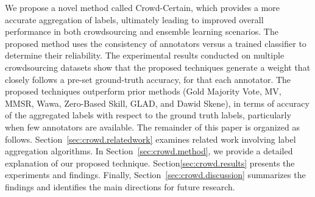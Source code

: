 We propose a novel method called Crowd-Certain, which provides a more accurate aggregation of labels, ultimately leading to improved overall performance in both crowdsourcing and ensemble learning scenarios. The proposed method uses the consistency of annotators versus a trained classifier to determine their reliability. The experimental results conducted on multiple crowdsourcing datasets show that the proposed techniques generate a weight that closely follows a pre-set ground-truth accuracy, for that each annotator. The proposed techniques outperform prior methods  (Gold Majority Vote, MV, MMSR, Wawa, Zero-Based Skill, GLAD, and Dawid Skene), in terms of accuracy of the aggregated labels with respect to the ground truth labels, particularly when few annotators are available.
The remainder of this paper is organized as follows. Section~\ref{sec:crowd.relatedwork} examines related work involving label aggregation algorithms. In Section~\ref{sec:crowd.method}, we provide a detailed explanation of our proposed technique. Section\ref{sec:crowd.results} presents the experiments and findings. Finally, Section~\ref{sec:crowd.discussion} summarizes the findings and identifies the main directions for future research.

